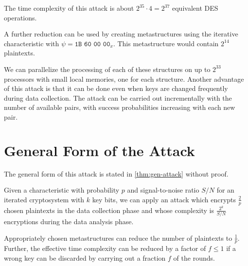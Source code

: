 \documentclass[twoside]{article}
\begin{document}
The time complexity of this attack is about \(2^{35} \cdot 4 = 2^{37}\)
equivalent DES operations.

A further reduction can be used by creating metastructures using the iterative
characteristic with \(\psi = \texttt{1B 60 00 00}_x\). This metastructure would
contain \(2^{14}\) plaintexts.

We can parallelize the processing of each of these structures on up to
\(2^{33}\) processors with small local memories, one for each structure. Another
advantage of this attack is that it can be done even when keys are changed
frequently during data collection. The attack can be carried out incrementally
with the number of available pairs, with success probabilities increasing with
each new pair.

\section{General Form of the Attack}

The general form of this attack is stated in \autoref{thm:gen-attack} without
proof.

\begin{theorem}
\label{thm:gen-attack}    
Given a characteristic with probability \(p\) and signal-to-noise ratio \(S/N\)
for an iterated cryptosystem with \(k\) key bits, we can apply an attack which
encrypts \(\frac{2}{p}\) chosen plaintexts in the data collection phase and
whose complexity is \(\frac{2^k}{S/N}\) encryptions during the data analysis
phase.
\end{theorem}

Appropriately chosen metastructures can reduce the number of plaintexts to
\(\frac{1}{p}\). Further, the effective time complexity can be reduced by a
factor of \(f \le 1\) if a wrong key can be discarded by carrying out a fraction
\(f\) of the rounds.
\end{document}
